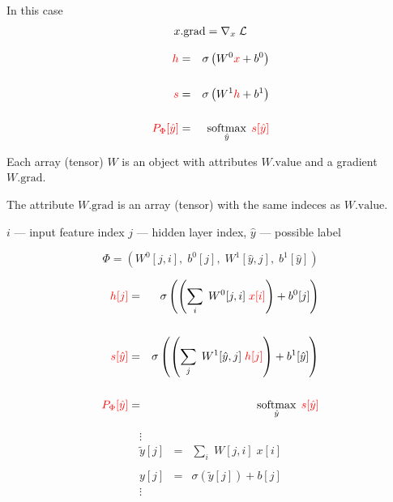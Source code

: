 {{\vfill
In this case
$$x.\mathrm{grad} = \nabla_x\;{\cal L}$$
}



\begin{eqnarray*}
  {\color{red} h} & = & \sigma\left(W^0{\color{red} x} + b^0\right) \\
  \\
  {\color{red} s} & = & \sigma\left(W^1{\color{red} h} + b^1 \right) \\
  \\
  {\color{red} P_\Phi[\hat{y}]} & = & \operatorname*{softmax}_{\hat{y}}\;{\color{red} s[\hat{y}]}
\end{eqnarray*}

\vfill
Each array (tensor) {\color{red} $W$} is an object with attributes {\color{red} $W.\mathrm{value}$} and a gradient {\color{red} $W.\mathrm{grad}$}.

\vfill
The attribute {\color{red} $W.\mathrm{grad}$} is an array (tensor) with the same indeces as {\color{red} $W.\mathrm{value}$}.


\centerline{$i$ --- input feature index \hspace{1em} $j$  --- hidden layer index, \hspace{1em} $\hat{y}$ --- possible label}
$$\Phi = (W^0[j,i],\;b^0[j],\;W^1[\hat{y},j],\;b^1[\hat{y}])$$

\vfill
\begin{eqnarray*}
  {\color{red} h[j]} & = & \sigma\left(\left(\sum_i\;W^0[j,i] \;{\color{red} x[i]}\right) + b^0[j]\right) \\
  \\
  {\color{red} s[\hat{y}]} & = & \sigma\left(\left(\sum_j\;W^1[\hat{y},j]\;{\color{red} h[j]}\right) + b^1[\hat{y}]\right) \\
  \\
  {\color{red} P_\Phi[\hat{y}]} & = & \operatorname*{softmax}_{\hat{y}}\;{\color{red} s[\hat{y}]}
\end{eqnarray*}

\vspace{-3ex}
\begin{eqnarray*}
\vdots \\
  \tilde{y}[j] & = & \sum_i\;W[j,i]\;x[i] \\
  \\
  y[j] & = & \sigma(\tilde{y}[j]) + b[j] \\
  \vdots
  \end{eqnarray*}

}

